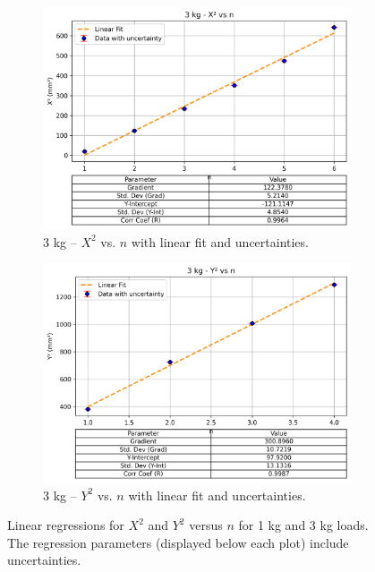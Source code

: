 \documentclass[a4paper,11pt]{article}
\begin{document}
\begin{figure}[H]
  \vspace{1em} %
  
  \begin{subfigure}[b]{0.45\textwidth}
    \centering
    \includegraphics[width=\textwidth]{3kg_X2_vs_n_with_errorbar.png}
    \caption{3 kg -- \(X^2\) vs. \(n\) with linear fit and uncertainties.}
    \label{fig:3kgX2vsn}
  \end{subfigure}
  \hfill
  \begin{subfigure}[b]{0.45\textwidth}
    \centering
    \includegraphics[width=\textwidth]{3kg_Y2_vs_n_with_errorbar.png}
    \caption{3 kg -- \(Y^2\) vs. \(n\) with linear fit and uncertainties.}
    \label{fig:3kgY2vsn}
  \end{subfigure}
  
  \caption{Linear regressions for \(X^2\) and \(Y^2\) versus \(n\) for 1 kg and 3 kg loads. The regression parameters (displayed below each plot) include uncertainties.}
  \label{fig:fits}
\end{figure}
\end{document}
